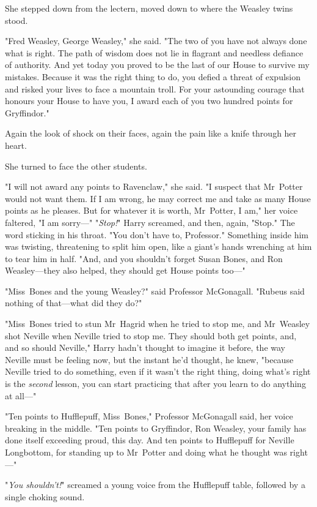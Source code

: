 She stepped down from the lectern, moved down to where the Weasley twins stood.

"Fred Weasley, George Weasley," she said. "The two of you have not always done
what is right. The path of wisdom does not lie in flagrant and needless
defiance of authority. And yet today you proved to be the last of our House to
survive my mistakes. Because it was the right thing to do, you defied a threat
of expulsion and risked your lives to face a mountain troll. For your
astounding courage that honours your House to have you, I award each of you two
hundred points for Gryffindor."

Again the look of shock on their faces, again the pain like a knife through her
heart.

She turned to face the other students.

"I will not award any points to Ravenclaw," she said. "I suspect that
Mr~Potter would not want them. If I am wrong, he may correct me and take as
many House points as he pleases. But for whatever it is worth, Mr~Potter, I
am," her voice faltered, "I am sorry---"
\later
"\emph{Stop!}" Harry screamed, and then, again, "Stop." The word sticking in
his throat. "You don't have to, Professor." Something inside him was twisting,
threatening to split him open, like a giant's hands wrenching at him to tear
him in half. "And, and you shouldn't forget Susan Bones, and Ron Weasley---they
also helped, they should get House points too---"

"Miss~Bones and the young Weasley?" said Professor McGonagall. "Rubeus said
nothing of that---what did they do?"

"Miss~Bones tried to stun Mr~Hagrid when he tried to stop me, and
Mr~Weasley shot Neville when Neville tried to stop me. They should both get
points, and, and so should Neville," Harry hadn't thought to imagine it before,
the way Neville must be feeling now, but the instant he'd thought, he knew,
"because Neville tried to do something, even if it wasn't the right thing,
doing what's right is the \emph{second} lesson, you can start practicing that
after you learn to do anything at all---"

"Ten points to Hufflepuff, Miss~Bones," Professor McGonagall said, her voice
breaking in the middle. "Ten points to Gryffindor, Ron Weasley, your family has
done itself exceeding proud, this day. And ten points to Hufflepuff for Neville
Longbottom, for standing up to Mr~Potter and doing what he thought was
right---"

"\emph{You shouldn't!}" screamed a young voice from the Hufflepuff table,
followed by a single choking sound.

